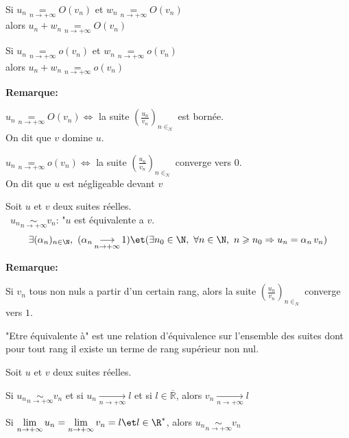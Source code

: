 \documentclass[12pt,twoside,a4paper]{article}
\begin{document}
		\begin{prop}
			\item Si $u_n\mathop{=}\limits_{n\rightarrow+\infty}O(v_n)$ et $w_n\mathop{=}\limits_{n\rightarrow+\infty}O(v_n)$\\
				alors $u_n+w_n\mathop{=}\limits_{n\rightarrow+\infty}O(v_n)$
			\item Si $u_n\mathop{=}\limits_{n\rightarrow+\infty}o(v_n)$ et $w_n\mathop{=}\limits_{n\rightarrow+\infty}o(v_n)$\\
				alors $u_n+w_n\mathop{=}\limits_{n\rightarrow+\infty}o(v_n)$
		\end{prop}
		\begin{flushleft}
			\textbf{Remarque:}
			\begin{liste}
				\item[\cercle1]$u_n\mathop{=}\limits_{n\rightarrow+\infty}O(v_n)\iff$ la suite $\left(\frac{u_n}{v_n}\right)_{n\in_N}$ est born\'ee.\\
					On dit que $v$ domine $u$.
				\item[\cercle2]$u_n\mathop{=}\limits_{n\rightarrow+\infty}o(v_n)\iff$ la suite $\left(\frac{u_n}{v_n}\right)_{n\in_N}$ converge vers $0$.\\
					On dit que $u$ est n\'egligeable devant $v$
			\end{liste}
		\end{flushleft}
		\begin{defi}
			Soit $u$ et $v$ deux suites r\'eelles.\\
			\textbullet\ $u_n\mathop{\sim}\limits_{n\rightarrow+\infty}v_n$: "$u$ est \'equivalente a $v$.\\
			$$\exists(\alpha_n)_{n\in\N},\ (\alpha_n\mathop{\longrightarrow}\limits_{n\rightarrow+\infty}1)\et(\exists n_0\in\N,\ \forall n\in\N,\ n\geqslant n_0\Rightarrow u_n=\alpha_n\,v_n)$$
		\end{defi}
		\begin{flushleft}
			\textbf{Remarque:}
			\begin{liste}
				\item Si $v_n$ tous non nuls a partir d'un certain rang, alors la suite $\left(\frac{u_n}{v_n}\right)_{n\in_N}$ converge vers $1$.
				\item "Etre \'equivalente \`a" est une relation d'\'equivalence sur l'ensemble des suites dont pour tout rang il existe un terme de rang sup\'erieur non nul.
			\end{liste}
		\end{flushleft}
		\begin{prop}
			Soit $u$ et $v$ deux suites r\'eelles.
			\begin{liste}
				\item Si $u_n\mathop{\sim}\limits_{n\rightarrow+\infty}v_n$ et si $u_n\mathop{\longrightarrow}\limits_{n\rightarrow+\infty}l$ et si $l\in\overline{\mathbb{R}}$, alors $v_n\mathop{\longrightarrow}\limits_{n\rightarrow+\infty}l$
				\item Si $\lim\limits_{n\rightarrow+\infty}u_n=\lim\limits_{n\rightarrow+\infty}v_n=l\et l\in\R^*$, alors $u_n\mathop{\sim}\limits_{n\rightarrow+\infty}v_n$
			\end{liste}
		\end{prop}
\end{document}
